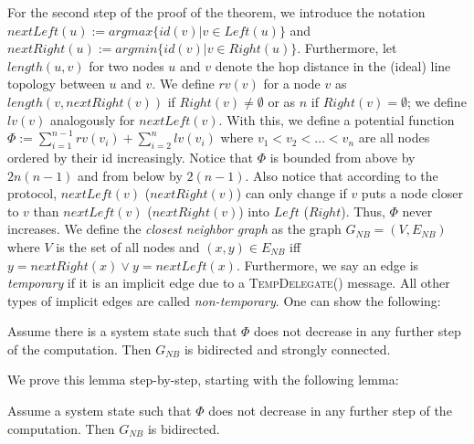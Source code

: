 \documentclass[a4paper,USenglish]{lipics}
\newcommand{\tempdelegate}[1]{\textsc{TempDelegate(\ensuremath{#1})}\xspace}
\begin{document}
For the second step of the proof of the theorem, we introduce the notation $nextLeft(u) := argmax \{id(v) | v \in Left(u)\}$ and $nextRight(u) := argmin \{id(v) | v \in Right(u)\}$.
Furthermore, let $length(u,v)$ for two nodes $u$ and $v$ denote the hop distance in the (ideal) line topology between $u$ and $v$.
We define $rv(v)$ for a node $v$ as $length(v,nextRight(v))$ if $Right(v) \neq \emptyset$ or as $n$ if $Right(v) = \emptyset$; we define $lv(v)$ analogously for $nextLeft(v)$.
With this, we define a potential function $\Phi := \sum_{i=1}^{n-1}rv(v_i) + \sum_{i=2}^{n}lv(v_i)$ where $v_1 < v_2 < \dots < v_n$ are all nodes ordered by their id increasingly.
Notice that $\Phi$ is bounded from above by $2n(n-1)$ and from below by $2(n-1)$.
Also notice that according to the protocol, $nextLeft(v)$ ($nextRight(v)$) can only change if $v$ puts a node closer to $v$ than $nextLeft(v)$ ($nextRight(v)$) into $Left$ ($Right$).
Thus, $\Phi$ never increases.
We define the \emph{closest neighbor graph} as the graph $G_{NB}=(V,E_{NB})$ where $V$ is the set of all nodes and $(x,y) \in E_{NB}$ iff $y=nextRight(x) \lor y=nextLeft(x)$.
Furthermore, we say an edge is \emph{temporary} if it is an implicit edge due to a \tempdelegate{} message.
 All other types of implicit edges are called \emph{non-temporary}.
One can show the following:
\begin{lemma}\label{lem:closest_neighbor_graph_bidirected_and_strongly_connected}
 Assume there is a system state such that $\Phi$ does not decrease in any further step of the computation.
 Then $G_{NB}$ is bidirected and strongly connected.
\end{lemma}
We prove this lemma step-by-step, starting with the following lemma:
\begin{lemma}\label{lem:closest_neighbor_graph_bidirected}
 Assume a system state such that $\Phi$ does not decrease in any further step of the computation.
 Then $G_{NB}$ is bidirected.
\end{lemma}
\end{document}
